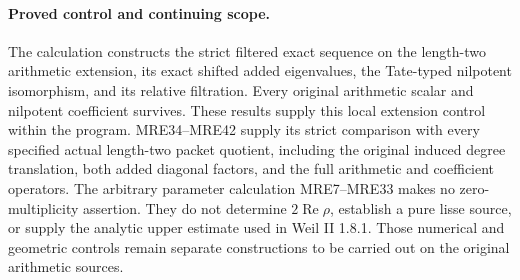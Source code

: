 \paragraph{Proved control and continuing scope.}
The calculation constructs the strict filtered exact sequence on the
length-two arithmetic extension, its exact shifted added eigenvalues,
the Tate-typed nilpotent isomorphism, and its relative filtration.
Every original arithmetic scalar and nilpotent coefficient survives.
These results supply this local extension control within the program.
MRE34--MRE42 supply its strict comparison with every specified actual
length-two packet quotient, including the original induced degree
translation, both added diagonal factors, and the full arithmetic
and coefficient operators. The arbitrary parameter calculation
MRE7--MRE33 makes no zero-multiplicity assertion.
They do not determine \(2\operatorname{Re}\rho\), establish a pure lisse
source, or supply the analytic upper estimate used in Weil II 1.8.1.
Those numerical and geometric controls remain separate constructions
to be carried out on the original arithmetic sources.
